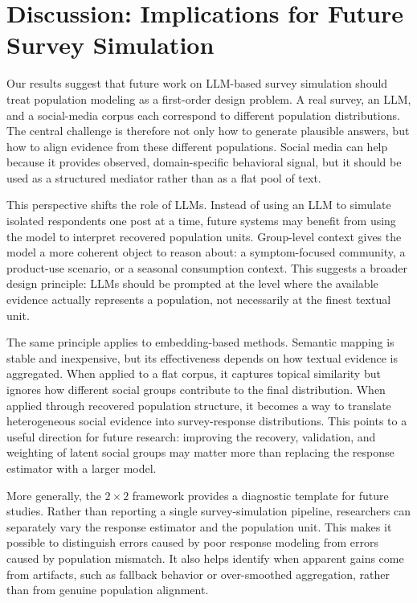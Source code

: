 \documentclass{article}
\begin{document}
\section{Discussion: Implications for Future Survey Simulation}
\label{sec:discussion}

Our results suggest that future work on LLM-based survey simulation should treat population modeling as a first-order design problem.
A real survey, an LLM, and a social-media corpus each correspond to different population distributions.
The central challenge is therefore not only how to generate plausible answers,
but how to align evidence from these different populations.
Social media can help because it provides observed, domain-specific behavioral signal,
but it should be used as a structured mediator rather than as a flat pool of text.

This perspective shifts the role of LLMs.
Instead of using an LLM to simulate isolated respondents one post at a time,
future systems may benefit from using the model to interpret recovered population units.
Group-level context gives the model a more coherent object to reason about:
a symptom-focused community, a product-use scenario, or a seasonal consumption context.
This suggests a broader design principle:
LLMs should be prompted at the level where the available evidence actually represents a population,
not necessarily at the finest textual unit.

The same principle applies to embedding-based methods.
Semantic mapping is stable and inexpensive,
but its effectiveness depends on how textual evidence is aggregated.
When applied to a flat corpus, it captures topical similarity but ignores how different social groups contribute to the final distribution.
When applied through recovered population structure,
it becomes a way to translate heterogeneous social evidence into survey-response distributions.
This points to a useful direction for future research:
improving the recovery, validation, and weighting of latent social groups may matter more than replacing the response estimator with a larger model.

More generally, the $2\times2$ framework provides a diagnostic template for future studies.
Rather than reporting a single survey-simulation pipeline,
researchers can separately vary the response estimator and the population unit.
This makes it possible to distinguish errors caused by poor response modeling from errors caused by population mismatch.
It also helps identify when apparent gains come from artifacts, such as fallback behavior or over-smoothed aggregation,
rather than from genuine population alignment.
\end{document}
